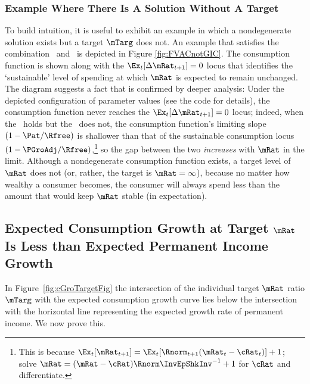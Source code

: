 \documentclass[BufferStockTheory]{subfiles}
\begin{document}
\subsubsection{Example Where There Is A Solution Without A Target}\label{subsubsec:FVACnotGIC}

To build intuition, it is useful to exhibit an example in which a nondegenerate solution exists but a target $\mTarg$ does not.  An example that satisfies the combination \FVAC~and~\cncl{\GICNrm} is depicted in Figure \ref{fig:FVACnotGIC}.  The consumption function is shown along with the $\Ex_{t}[\Delta \mRat_{t+1}]=0$ locus that identifies the `sustainable' level of spending at which $\mRat$ is expected to remain unchanged.  The diagram suggests a fact that is confirmed by deeper analysis: Under the depicted configuration of parameter values (see the code for details), the consumption function never reaches the $\Ex_{t}[\Delta \mRat_{t+1}]=0$ locus; indeed, when the \RIC~holds but the \GICNrm~does not, the consumption function's limiting slope $(1-\Pat/\Rfree)$ is shallower than that of the sustainable consumption locus $(1-\PGroAdj/\Rfree)$,\footnote{This is because $\Ex_{t}[\mRat_{t+1}]=\Ex_{t}[\Rnorm_{t+1}(\mRat_{t}-\cRat_{t})]+1$; solve $\mRat = (\mRat - \cRat)\Rnorm \InvEpShkInv^{-1}+1$ for $\cRat$ and differentiate.}  so the gap between the two \textit{increases} with $\mRat$ in the limit.  Although a nondegenerate consumption function exists, a target level of $\mRat$ does not (or, rather, the target is $\mRat=\infty$), because no matter how wealthy a consumer becomes, the consumer will always spend less than the amount that would keep $\mRat$ stable (in expectation).

\renewcommand{\figFile}{FVACnotGIC}
\hypertarget{\figFile}{}




\hypertarget{cGroLTpGro}{}
\subsection{Expected Consumption Growth at Target $\mRat$ Is Less than
  Expected Permanent Income Growth}

\label{subsec:expcgrowth} In Figure~\ref{fig:cGroTargetFig} the intersection of
the individual target $\mRat$ ratio $\mTarg$ with the expected consumption
growth curve lies below the intersection with the horizontal line
representing the expected growth rate of permanent income. We now prove this.
\end{document}
